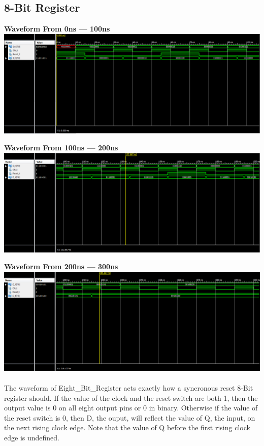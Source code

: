 \documentclass[12pt]{report}
\begin{document}
	\subsection*{8-Bit Register}
		\begin{center}
			\textbf{Waveform From 0ns --- 100ns}
			\includegraphics[scale=.47]{tb_1.PNG}
		\end{center}
		\begin{center}
			\textbf{Waveform From 100ns --- 200ns}
			\includegraphics[scale=.47]{tb_2.PNG}
		\end{center}
		\begin{center}
			\vspace {7cm}
			\textbf{Waveform From 200ns --- 300ns}
			\includegraphics[scale=.47]{tb_3.PNG}
		\end{center}
		
		\paragraph{}
		The waveform of Eight\_Bit\_Register acts exactly how a syncronous reset 8-Bit register should.  If the value of the clock and the reset switch are both 1, then 
		the output value is 0 on all eight output pins or 0 in binary.  Otherwise if the value of the reset switch is 0, then D, the ouput, will reflect the value of Q, the input, 
		on the next rising clock edge.  Note that the value of Q before the first rising clock edge is undefined.
\end{document}
